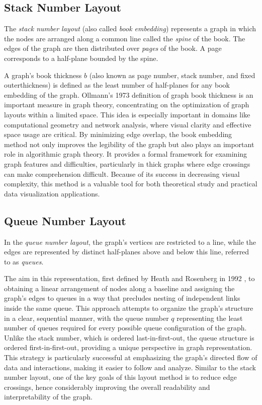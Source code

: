 \documentclass[bachelor, english]{algothesis}
\begin{document}
\subsection{Stack Number Layout}
\begin{definition}
    The \emph{stack number layout} (also called \emph{book embedding}) represents a graph in which the nodes are arranged along a common line called the \emph{spine} of the book. The edges of the graph are then distributed over \emph{pages} of the book. A page corresponds to a half-plane bounded by the spine.
\end{definition}
\noindent
A graph's book thickness $b$ (also known as page number, stack number, and fixed outerthickness) is defined as the least number of half-planes for any book embedding of the graph. Ollmann's 1973 definition \cite{book_thickness} of graph book thickness is an important measure in graph theory, concentrating on the optimization of graph layouts within a limited space. This idea is especially important in domains like computational geometry and network analysis, where visual clarity and effective space usage are critical. By minimizing edge overlap, the book embedding method not only improves the legibility of the graph but also plays an important role in algorithmic graph theory. It provides a formal framework for examining graph features and difficulties, particularly in thick graphs where edge crossings can make comprehension difficult. Because of its success in decreasing visual complexity, this method is a valuable tool for both theoretical study and practical data visualization applications.

\subsection{Queue Number Layout}
\begin{definition}
    In the \emph{queue number layout}, the graph's vertices are restricted to a line, while the edges are represented by distinct half-planes above and below this line, referred to as \emph{queues}.
\end{definition}
\noindent
The aim in this representation, first defined by Heath and Rosenberg in 1992 \cite{queue_layout}, to obtaining a linear arrangement of nodes along a baseline and assigning the graph's edges to queues in a way that precludes nesting of independent links inside the same queue. This approach attempts to organize the graph's structure in a clear, sequential manner, with the queue number $q$ representing the least number of queues required for every possible queue configuration of the graph. Unlike the stack number, which is ordered last-in-first-out, the queue structure is ordered first-in-first-out, providing a unique perspective in graph representation. This strategy is particularly successful at emphasizing the graph's directed flow of data and interactions, making it easier to follow and analyze. Similar to the stack number layout, one of the key goals of this layout method is to reduce edge crossings, hence considerably improving the overall readability and interpretability of the graph.
\end{document}
